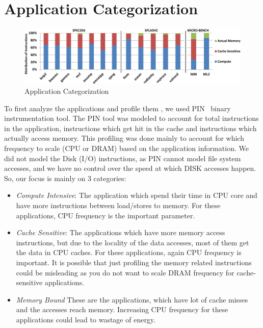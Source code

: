 \section{Application Categorization}\label{sec:appl}

\begin{figure}[htp]
  \begin{center}
\includegraphics[width=\linewidth]{figs/app-cat-crop.pdf}
  \end{center}
  \vspace{-0.1in}
  \caption{Application Categorization}
  \label{fig:def-perf}
\end{figure}
\fi

To first analyze the applications and profile them , we used PIN~\cite{pin} binary instrumentation tool. The PIN tool was modeled to account for total instructions in the application, instructions which get hit in the cache and instructions which actually access memory. 
This profiling was done mainly to account for
which frequency to scale (CPU or DRAM) based on the application information. 
We did not model the Disk (I/O) instructions, as PIN cannot model file system accesses, and
we have no control over the speed at which DISK accesses happen. So, our focus is
mainly on 3 categories:

\begin{itemize} 
\item \textit{Compute Intensive}: The application which spend their time in CPU core and have
more instructions between load/stores to memory. For these applications, CPU
frequency is the important parameter.
\item \textit{Cache Sensitive}: The applications which have more memory access instructions,
but due to the locality of the data accesses, most of them get the data in CPU caches.
For these applications, again CPU frequency is important. It is possible that just
profiling the memory related instructions could be misleading as you do not want to
scale DRAM frequency for cache-sensitive applications.
\item \textit{Memory Bound} These are the applications, which have lot of cache misses
and the accesses reach memory. Increasing CPU frequency for these applications could 
lead to wastage of energy. 
\end{itemize}

